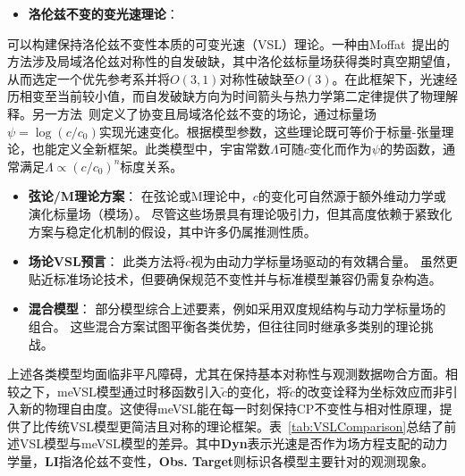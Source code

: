 \documentclass[jkps,preprint,fleqn]{revtex4}
\newcommand{\tc}{\tilde{c}}
\begin{document}
\begin{CJK*}{UTF8}{gbsn}
\begin{itemize}
    \item \textbf{洛伦兹不变的变光速理论}：
\end{itemize}
可以构建保持洛伦兹不变性本质的可变光速（VSL）理论。一种由Moffat~\cite{Moffat:1992ud}提出的方法涉及局域洛伦兹对称性的自发破缺，其中洛伦兹标量场获得类时真空期望值，从而选定一个优先参考系并将$O(3,1)$对称性破缺至$O(3)$。在此框架下，光速经历相变至当前较小值，而自发破缺方向为时间箭头与热力学第二定律提供了物理解释。另一方法~\cite{Magueijo:2000zt}则定义了协变且局域洛伦兹不变的场论，通过标量场$\psi = \log(c/c_0)$实现光速变化。根据模型参数，这些理论既可等价于标量-张量理论，也能定义全新框架。此类模型中，宇宙常数$\Lambda$可随$c$变化而作为$\psi$的势函数，通常满足$\Lambda \propto (c/c_0)^n$标度关系\cite{Manida:1999rx,Barrow:1999st,Stepanov:1999ax,Magueijo:2000au,Moffat:2002nm}。

\begin{itemize}
  \item \textbf{弦论/M理论方案}：
    在弦论或M理论中，$c$的变化可自然源于额外维动力学或演化标量场（模场）\cite{Kaelbermann:1998hu,Randall:1999ee,Randall:1999vf,Kiritsis:1999tx,Chung:1999xg,Alexander:1999cb,Ishihara:2000nf,Csaki:2000dm,Youm:2001sw,Youm:2001zk,Grojean:2001pv,Youm:2001zp}。
    尽管这些场景具有理论吸引力，但其高度依赖于紧致化方案与稳定化机制的假设，其中许多仍属推测性质。
   \item \textbf{场论VSL预言}：
    此类方法将$c$视为由动力学标量场驱动的有效耦合量\cite{Drummond:1979pp,Novello:1988ma,Barton:1989dq,Scharnhorst:1990sr,Shore:1995fz,Colladay:1995qb,Coleman:1998ti,Bertolami:1999da,Shore:2000bs,Greenberg:2002uu,Teyssandier:2003qh,Shore:2003zc,Blasone:2003wf}。
    虽然更贴近标准场论技术，但要确保规范不变性并与标准模型兼容仍需复杂构造。
    \item \textbf{混合模型}：
    部分模型综合上述要素，例如采用双度规结构与动力学标量场的组合\cite{Alexander:2001dr,Burgess:2002tb}。
    这些混合方案试图平衡各类优势，但往往同时继承多类别的理论挑战。
\end{itemize}

上述各类模型均面临非平凡障碍，尤其在保持基本对称性与观测数据吻合方面。相较之下，meVSL模型通过时移函数引入$\tc$的变化，将$\tc$的改变诠释为坐标效应而非引入新的物理自由度。这使得meVSL能在每一时刻保持CP不变性与相对性原理，提供了比传统VSL模型更简洁且对称的理论框架。表~\ref{tab:VSLComparison}总结了前述VSL模型与meVSL模型的差异。其中\textbf{Dyn}表示光速是否作为场方程支配的动力学量，\textbf{LI}指洛伦兹不变性，\textbf{Obs. Target}则标识各模型主要针对的观测现象。

\end{CJK*}
\end{document}
